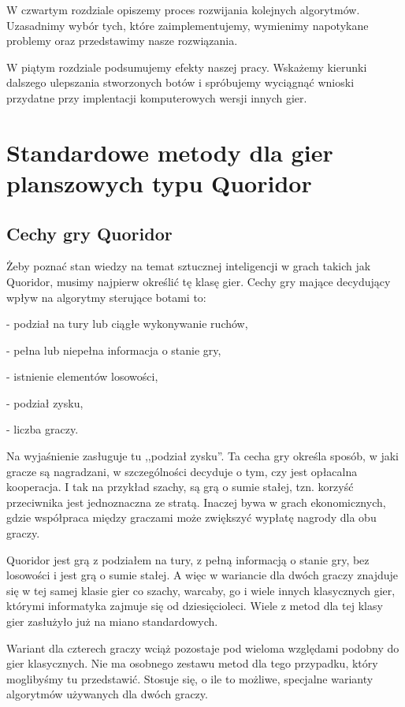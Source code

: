 \documentclass{pracamgr}
\begin{document}
W czwartym rozdziale opiszemy proces rozwijania kolejnych algorytmów.
Uzasadnimy wybór tych, które zaimplementujemy, wymienimy napotykane problemy oraz przedstawimy nasze rozwiązania.

W piątym rozdziale podsumujemy efekty naszej pracy.
Wskażemy kierunki dalszego ulepszania stworzonych botów i spróbujemy wyciągnąć wnioski przydatne przy implentacji komputerowych wersji innych gier.

\chapter{Standardowe metody dla gier planszowych typu Quoridor}

\section{Cechy gry Quoridor}

Żeby poznać stan wiedzy na temat sztucznej inteligencji w grach takich jak Quoridor, musimy najpierw określić tę klasę gier.
Cechy gry mające decydujący wpływ na algorytmy sterujące botami to:

 - podział na tury lub ciągłe wykonywanie ruchów,

 - pełna lub niepełna informacja o stanie gry,

 - istnienie elementów losowości,

 - podział zysku,

 - liczba graczy.

Na wyjaśnienie zasługuje tu ,,podział zysku''.
Ta cecha gry określa sposób, w jaki gracze są nagradzani, w szczególności decyduje o tym, czy jest opłacalna kooperacja. I tak na przykład szachy, są grą o sumie stałej, tzn. korzyść przeciwnika jest jednoznaczna ze stratą. Inaczej bywa w grach ekonomicznych, gdzie współpraca między graczami może zwiększyć wypłatę nagrody dla obu graczy.

Quoridor jest grą z podziałem na tury, z pełną informacją o stanie gry, bez losowości i jest grą o sumie stałej.
A więc w wariancie dla dwóch graczy znajduje się w tej samej klasie gier co szachy, warcaby, go i wiele innych klasycznych gier, którymi informatyka zajmuje się od dziesięcioleci.
Wiele z metod dla tej klasy gier zasłużyło już na miano standardowych.

Wariant dla czterech graczy wciąż pozostaje pod wieloma względami podobny do gier klasycznych.
Nie ma osobnego zestawu metod dla tego przypadku, który moglibyśmy tu przedstawić.
Stosuje się, o ile to możliwe, specjalne warianty algorytmów używanych dla dwóch graczy.
\end{document}
